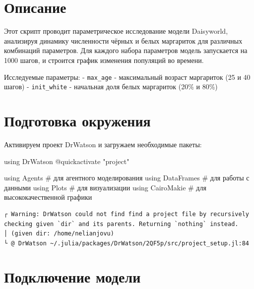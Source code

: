 \documentclass[
  12pt,
  a4paper,
  DIV=11,
  numbers=noendperiod]{scrreprt}
\newenvironment{Shaded}{\begin{snugshade}}{\end{snugshade}}
\newcommand{\BuiltInTok}[1]{\textcolor[rgb]{0.00,0.23,0.31}{#1}}
\newcommand{\CommentTok}[1]{\textcolor[rgb]{0.37,0.37,0.37}{#1}}
\newcommand{\ImportTok}[1]{\textcolor[rgb]{0.00,0.46,0.62}{#1}}
\newcommand{\PreprocessorTok}[1]{\textcolor[rgb]{0.68,0.00,0.00}{#1}}
\newcommand{\StringTok}[1]{\textcolor[rgb]{0.13,0.47,0.30}{#1}}
\begin{document}
\section{Описание}\label{ux43eux43fux438ux441ux430ux43dux438ux435-4}

Этот скрипт проводит параметрическое исследование модели Daisyworld,
анализируя динамику численности чёрных и белых маргариток для различных
комбинаций параметров. Для каждого набора параметров модель запускается
на 1000 шагов, и строится график изменения популяций во времени.

Исследуемые параметры: - \texttt{max\_age} - максимальный возраст
маргариток (25 и 40 шагов) - \texttt{init\_white} - начальная доля белых
маргариток (20\% и 80\%)

\section{Подготовка
окружения}\label{ux43fux43eux434ux433ux43eux442ux43eux432ux43aux430-ux43eux43aux440ux443ux436ux435ux43dux438ux44f-4}

Активируем проект DrWatson и загружаем необходимые пакеты:

\begin{Shaded}
\begin{Highlighting}[]
\ImportTok{using} \BuiltInTok{DrWatson}
\PreprocessorTok{@quickactivate} \StringTok{"project"}

\ImportTok{using} \BuiltInTok{Agents}      \CommentTok{\# для агентного моделирования}
\ImportTok{using} \BuiltInTok{DataFrames}  \CommentTok{\# для работы с данными}
\ImportTok{using} \BuiltInTok{Plots}       \CommentTok{\# для визуализации}
\ImportTok{using} \BuiltInTok{CairoMakie}  \CommentTok{\# для высококачественной графики}
\end{Highlighting}
\end{Shaded}

\begin{verbatim}
┌ Warning: DrWatson could not find find a project file by recursively checking given `dir` and its parents. Returning `nothing` instead.
│ (given dir: /home/nelianjovu)
└ @ DrWatson ~/.julia/packages/DrWatson/2QF5p/src/project_setup.jl:84
\end{verbatim}

\section{Подключение
модели}\label{ux43fux43eux434ux43aux43bux44eux447ux435ux43dux438ux435-ux43cux43eux434ux435ux43bux438-4}
\end{document}
